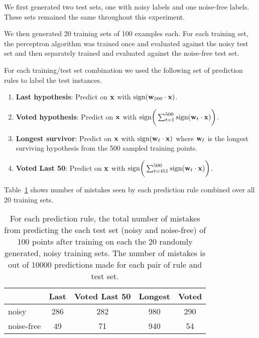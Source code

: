 \documentclass[12pt]{article}
\begin{document}
\begin{enumerate}
\begin{enumerate}
We first generated two test sets, one with noisy labels and one noise-free
labels. These sets remained the same throughout this experiment.

We then generated 20 training sets of 100 examples each. For each training
set, the perceptron algorithm was trained once and evaluated against the
noisy test set and then separately trained and evaluated against the
noise-free test set.

For each training/test set combination we used the following set of prediction
rules to label the test instances.

\begin{enumerate}
    \item {\bf Last hypothesis}:
        Predict on ${\bf x}$ with $\text{sign}({\bf w}_{500} \cdot {\bf x})$.
    \item {\bf Voted hypothesis}:
        Predict on ${\bf x}$ with $\text{sign}\bigg(\sum_{t=1}^{500}\text{sign}({\bf w}_t \cdot {\bf x})\bigg)$.
    \item {\bf Longest survivor}:
        Predict on ${\bf x}$ with $\text{sign}({\bf w}_\ell \cdot {\bf x})$ where ${\bf w}_\ell$ is the longest surviving hypothesis from the 500 sampled training points.
    \item {\bf Voted Last 50}:
        Predict on ${\bf x}$ with $\text{sign}\bigg(\sum_{t=451}^{500}\text{sign}({\bf w}_t \cdot {\bf x})\bigg)$.
\end{enumerate}

Table~\ref{tab:ex2} shows number of mistakes seen by each prediction rule combined over all 20
training sets.

\begin{table}[htd]
\begin{center}
\begin{tabular}{l||c|c|c|c}
           & Last  & Voted Last 50 & Longest & Voted \\
               \hline
  noisy  &   286  &   282  &   980  &   290 \\ 
  noise-free  &    49  &    71  &   940   &   54 \\
\end{tabular}
\end{center}
\caption{
For each prediction rule, the total number of mistakes from predicting the
each test set (noisy and noise-free) of 100 points after training on each
the 20 randomly generated, noisy training sets. The number of mistakes is
out of 10000 predictions made for each pair of rule and test set.}
\label{tab:ex2}
\end{table}%



\end{enumerate}
\end{enumerate}
\end{document}
